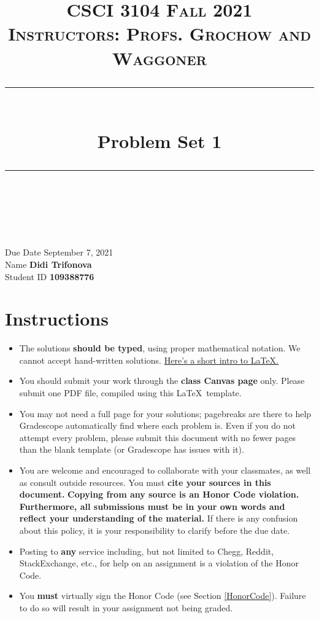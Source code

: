 \documentclass[11pt]{article}
\title{
\normalfont \normalsize 
\textsc{CSCI 3104 Fall 2021 \\ 
Instructors: Profs. Grochow and Waggoner} \\
[10pt] 
\rule{\linewidth}{0.5pt} \\[6pt] 
\huge Problem Set 1 \\
\rule{\linewidth}{2pt}  \\[10pt]
}
\date{}
\theoremstyle{definition}
\theoremstyle{definition}
\theoremstyle{definition}
\begin{document}
\maketitle


\noindent
Due Date \dotfill September 7, 2021 \\
Name \dotfill \textbf{Didi Trifonova} \\
Student ID \dotfill \textbf{109388776} 

\tableofcontents

\section{Instructions}
 \begin{itemize}
	\item The solutions \textbf{should be typed}, using proper mathematical notation. We cannot accept hand-written solutions. \href{http://ece.uprm.edu/~caceros/latex/introduction.pdf}{Here's a short intro to \LaTeX.}
	\item You should submit your work through the \textbf{class Canvas page} only. Please submit one PDF file, compiled using this \LaTeX \ template.
	\item You may not need a full page for your solutions; pagebreaks are there to help Gradescope automatically find where each problem is. Even if you do not attempt every problem, please submit this document with no fewer pages than the blank template (or Gradescope has issues with it).

	\item You are welcome and encouraged to collaborate with your classmates, as well as consult outside resources. You must \textbf{cite your sources in this document.} \textbf{Copying from any source is an Honor Code violation. Furthermore, all submissions must be in your own words and reflect your understanding of the material.} If there is any confusion about this policy, it is your responsibility to clarify before the due date. 

	\item Posting to \textbf{any} service including, but not limited to Chegg, Reddit, StackExchange, etc., for help on an assignment is a violation of the Honor Code.

	\item You \textbf{must} virtually sign the Honor Code (see Section \ref{HonorCode}). Failure to do so will result in your assignment not being graded.
\end{itemize}
\end{document}
